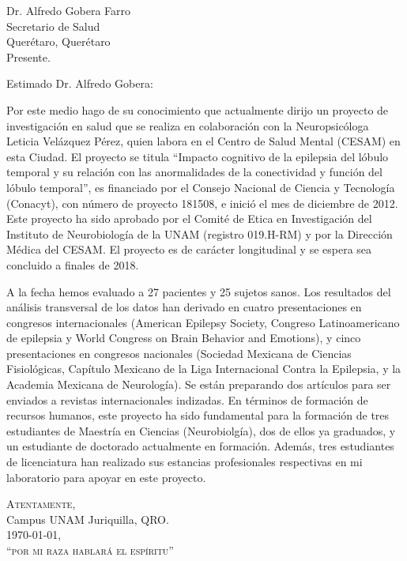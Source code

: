 \documentclass[final,10pt]{letter}
\date{}  %
\begin{document}
  \setlength{\wpYoffset}{-10pt}
\pagestyle{empty}

\begin{letter}{%
Dr. Alfredo Gobera Farro \\
Secretario de Salud \\
Querétaro, Querétaro \\
Presente.
}



\opening{Estimado Dr. Alfredo Gobera:}


Por este medio hago de su conocimiento que actualmente dirijo un proyecto de investigación en salud que se realiza en colaboración con la Neuropsicóloga Leticia Velázquez Pérez, quien labora en el Centro de Salud Mental (CESAM) en esta Ciudad. El proyecto se titula ``Impacto cognitivo de la epilepsia del lóbulo temporal y su relación con las anormalidades de la conectividad y función del lóbulo temporal'', es financiado por el Consejo Nacional de Ciencia y Tecnología (Conacyt), con número de proyecto 181508, e inició el mes de diciembre de 2012. Este proyecto ha sido aprobado por el Comité de Etica en Investigación del Instituto de Neurobiología de la UNAM (registro 019.H-RM) y por la Dirección Médica del CESAM. El proyecto es de carácter longitudinal y se espera sea concluido a finales de 2018.

A la fecha hemos evaluado a 27 pacientes y 25 sujetos sanos. Los resultados del análisis transversal de los datos han derivado en cuatro presentaciones en congresos internacionales (American Epilepsy Society, Congreso Latinoamericano de epilepsia y World Congress on Brain Behavior and Emotions), y cinco presentaciones en congresos nacionales (Sociedad Mexicana de Ciencias Fisiológicas, Capítulo Mexicano de la Liga Internacional Contra la Epilepsia, y la Academia Mexicana de Neurología). Se están preparando dos artículos para ser enviados a revistas internacionales indizadas. En términos de formación de recursos humanos, este proyecto ha sido fundamental para la formación de tres estudiantes de Maestría en Ciencias (Neurobiolgía), dos de ellos ya graduados, y un estudiante de doctorado actualmente en formación. Además, tres estudiantes de licenciatura han realizado sus estancias profesionales respectivas en mi laboratorio para apoyar en este proyecto.



\bigskip

\begin{flushright}
  \closing{\textsc{Atentamente},\\
  Campus UNAM Juriquilla, QRO. \\
  \today,\\
  \textsc{``por mi raza hablará el espíritu''}  
}
\end{flushright}



\end{letter}
\end{document}
